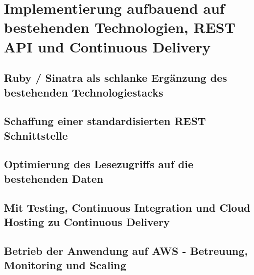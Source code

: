 \chapter{Implementierung aufbauend auf bestehenden Technologien, REST API und Continuous Delivery}

\section{Ruby / Sinatra als schlanke Ergänzung des bestehenden Technologiestacks}

\section{Schaffung einer standardisierten REST Schnittstelle}

\section{Optimierung des Lesezugriffs auf die bestehenden Daten}

\section{Mit Testing, Continuous Integration und Cloud Hosting zu Continuous Delivery}

\section{Betrieb der Anwendung auf AWS - Betreuung, Monitoring und Scaling}